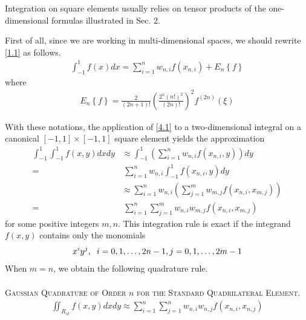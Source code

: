 \documentclass[a4paper]{article}
\numberwithin{equation}{section}
\begin{document}
Integration on square elements usually relies on tensor products of the one-dimensional formulas illustrated in Sec. 2. 

First of all, since we are working in multi-dimensional spaces, we should rewrite \eqref{1.1} as follows.
\begin{align}
\label{4.1}
\int_{ - 1}^1 {f\left( x \right)dx}  = \sum\limits_{i = 1}^n {{w_{n,i}}f\left( {{x_{n,i}}} \right)}  + {E_n}\left\{ f \right\}
\end{align}
where
\begin{align}
{E_n}\left\{ f \right\} = \frac{2}{{\left( {2n + 1} \right)!}}{\left( {\frac{{{2^n}{{\left( {n!} \right)}^2}}}{{\left( {2n} \right)!}}} \right)^2}{f^{\left( {2n} \right)}}\left( \xi  \right)
\end{align}

With these notations, the application of \eqref{4.1} to a two-dimensional integral on a canonical $\left[ { - 1,1} \right] \times \left[ { - 1,1} \right]$ square element yields the approximation
\begin{align}
\int_{ - 1}^1 {\int_{ - 1}^1 {f\left( {x,y} \right)dx} dy}  &\approx \int_{ - 1}^1 {\left( {\sum\limits_{i = 1}^n {{w_{n,i}}f\left( {{x_{n,i}},y} \right)} } \right)dy} \\
=&\ \sum\limits_{i = 1}^n {{w_{n,i}}\int_{ - 1}^1 {f\left( {{x_{n,i}},y} \right)dy} } \\
 &\approx \sum\limits_{i = 1}^n {{w_{n,i}}\left( {\sum\limits_{j = 1}^m {{w_{m,j}}f\left( {{x_{n,i}},{x_{m,j}}} \right)} } \right)} \\
=&\ \sum\limits_{i = 1}^n {\sum\limits_{j = 1}^m {{w_{n,i}}{w_{m,j}}f\left( {{x_{n,i}},{x_{m,j}}} \right)} } \label{4.6}
\end{align}
for some positive integers $m,n$. This integration rule is exact if the integrand $f\left(x,y\right)$ contains only the monomials 
\begin{align}
{x^i}{y^j},\hspace{0.2cm}i = 0,1, \ldots ,2n - 1,j = 0,1, \ldots ,2m - 1
\end{align}
When $m=n$, we obtain the following quadrature rule.\\
\\
\textsc{Gaussian Quadrature of Order $n$ for the Standard Quadrilateral Element.}
\begin{align}
\label{4.8}
\iint_{{R_{st}}} {f\left( {x,y} \right)dxdy}  \approx \sum\limits_{i = 1}^n {\sum\limits_{j = 1}^n {{w_{n,i}}{w_{n,j}}f\left( {{x_{n,i}},{x_{n,j}}} \right)} } 
\end{align}
\end{document}
